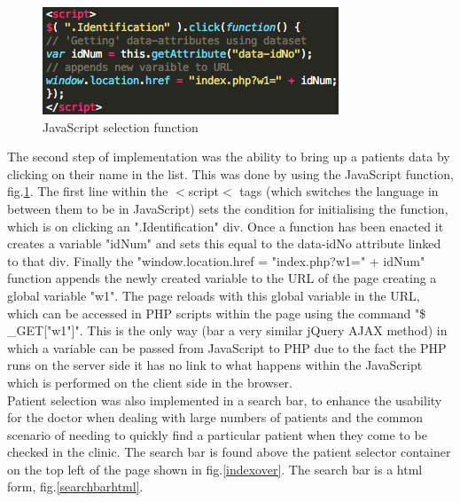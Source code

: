 \documentclass[11pt]{article}
\begin{document}
\begin{figure}
\centering
\includegraphics[scale=0.5]{selectfunc.png}
\caption{JavaScript selection function \label{selectfunc}} 
\end{figure}
The second step of implementation was the ability to bring up a patients data by clicking on their name in the list. This was done by using the JavaScript function, fig.\ref{selectfunc}. The first line within the $<$script$<$ tags (which switches the language in between them to be in JavaScript) sets the condition for initialising the function, which is on clicking an ".Identification" div. Once a function has been enacted it creates a variable "idNum" and sets this equal to the data-idNo attribute linked to that div. Finally the "window.location.href = "index.php?w1=" + idNum" function appends the newly created variable to the URL of the page creating a global variable "w1". The page reloads with this global variable in the URL, which can be accessed in PHP scripts within the page using the command "\$ \_GET["w1"]". This is the only way (bar a very similar jQuery AJAX method) in which a variable can be passed from JavaScript to PHP due to the fact the PHP runs on the server side it has no link to what happens within the JavaScript which is performed on the client side in the browser. 
\\ \indent
Patient selection was also implemented in a search bar, to enhance the usability for the doctor when dealing with large numbers of patients and the common scenario of needing to quickly find a particular patient when they come to be checked in the clinic. The search bar is found above the patient selector container on the top left of the page shown in fig.\ref{indexover}. The search bar is a html form, fig.\ref{searchbarhtml}. 
\end{document}
